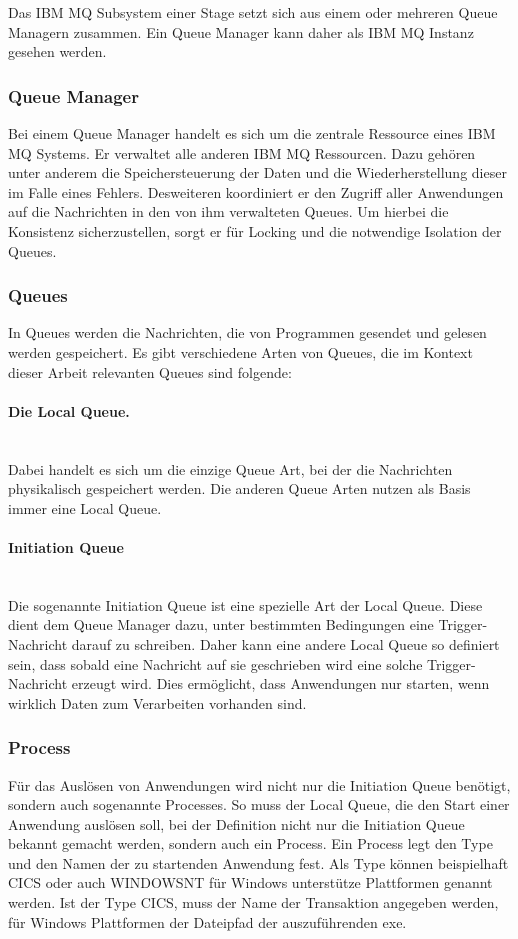 Das IBM MQ Subsystem einer Stage setzt sich aus einem oder mehreren Queue Managern zusammen.
Ein Queue Manager kann daher als IBM MQ Instanz gesehen werden.

\subsubsection{Queue Manager}
Bei einem Queue Manager handelt es sich um die zentrale Ressource eines IBM MQ Systems.
Er verwaltet  alle anderen IBM MQ Ressourcen.
Dazu gehören unter anderem die Speichersteuerung der Daten und die Wiederherstellung dieser im Falle eines Fehlers.
Desweiteren koordiniert er den Zugriff aller Anwendungen auf die Nachrichten in den von ihm verwalteten Queues.
Um hierbei die Konsistenz sicherzustellen, sorgt er für Locking und die notwendige Isolation der Queues.
\cite{Aranha.2013}

\subsubsection{Queues}
In Queues werden die Nachrichten, die von Programmen gesendet und gelesen werden gespeichert.
Es gibt verschiedene Arten von Queues, die im Kontext dieser Arbeit relevanten Queues sind folgende:

\paragraph{Die Local Queue.}~\\
Dabei handelt es sich um die einzige Queue Art, bei der die Nachrichten physikalisch gespeichert werden.
Die anderen Queue Arten nutzen als Basis immer eine Local Queue.

\paragraph{Initiation Queue}~\\
Die sogenannte \glqq Initiation Queue\grqq{} ist eine spezielle Art der Local Queue.
Diese dient dem Queue Manager dazu, unter bestimmten Bedingungen eine Trigger-Nachricht darauf zu schreiben.
Daher kann eine andere Local Queue so definiert sein, dass sobald eine Nachricht auf sie geschrieben wird eine solche Trigger-Nachricht erzeugt wird.
Dies ermöglicht, dass Anwendungen nur starten, wenn wirklich Daten zum Verarbeiten vorhanden sind.
\cite{Aranha.2013}

\subsubsection{Process}
Für das Auslösen von Anwendungen wird nicht nur die Initiation Queue benötigt, sondern auch sogenannte \glqq Processes\grqq.
So muss der Local Queue, die den Start einer Anwendung auslösen soll, bei der Definition nicht nur die Initiation Queue bekannt gemacht werden, sondern auch ein Process.
Ein Process legt den \glqq Type\grqq{} und den Namen der zu startenden Anwendung fest.
Als \glqq Type\grqq{} können beispielhaft CICS oder auch WINDOWSNT für Windows unterstütze Plattformen genannt werden.
Ist der \glqq Type\grqq{} CICS,  muss der Name der Transaktion angegeben werden, für Windows Plattformen der Dateipfad der auszuführenden exe.
\cite{Aranha.2013}

